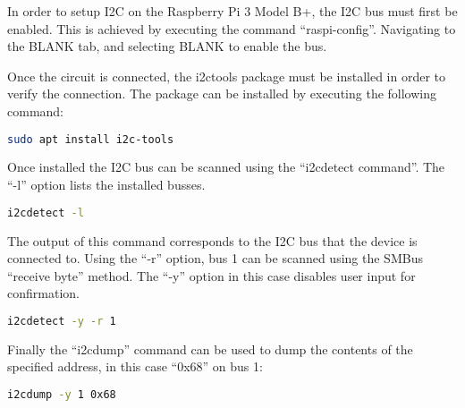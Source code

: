 In order to setup I2C on the Raspberry Pi 3 Model B+, the I2C bus must first be
enabled. This is achieved by executing the command ``raspi-config''. Navigating
to the BLANK tab, and selecting BLANK to enable the bus.

Once the circuit is connected, the i2ctools package must be installed in order
to verify the connection. The package can be installed by executing the
following command:

\begin{lstlisting}[language=bash]
	sudo apt install i2c-tools
\end{lstlisting}

Once installed the I2C bus can be scanned using the ``i2cdetect command''. The
``-l'' option lists the installed busses.

\begin{lstlisting}[language=bash]
	i2cdetect -l
\end{lstlisting}

The output of this command corresponds to the I2C bus that the device is
connected to. Using the ``-r'' option, bus 1 can be scanned using
the SMBus ``receive byte'' method. The ``-y'' option in this case disables user
input for confirmation.

\begin{lstlisting}[language=bash]
	i2cdetect -y -r 1
\end{lstlisting}

Finally the ``i2cdump'' command can be used to dump the contents of the
specified address, in this case ``0x68'' on bus 1:

\begin{lstlisting}[language=bash]
	i2cdump -y 1 0x68
\end{lstlisting}
